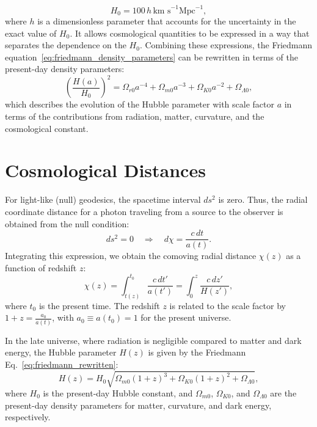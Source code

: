 \begin{equation}
    H_0 = 100 \, h \, \text{km s}^{-1} \text{Mpc}^{-1},
    \label{eq:hubble_parameter_current}
\end{equation}
where \( h \) is a dimensionless parameter that accounts for the uncertainty in the exact value of \( H_0 \). It allows cosmological quantities to be expressed in a way that separates the dependence on the $H_0$.
Combining these expressions, the Friedmann equation~\eqref{eq:friedmann_density_parameters} can be rewritten in terms of the present-day density parameters:
\begin{equation}
    \left( \frac{H(a)}{H_0} \right)^2 = \Omega_{r0} a^{-4} + \Omega_{m0} a^{-3} + \Omega_{K0} a^{-2} + \Omega_{\Lambda0},
    \label{eq:friedmann_rewritten}
\end{equation}
which describes the evolution of the Hubble parameter with scale factor \( a \) in terms of the contributions from radiation, matter, curvature, and the cosmological constant.

\section{Cosmological Distances}
For light-like (null) geodesics, the spacetime interval \( ds^2 \) is zero. Thus, the radial coordinate distance for a photon traveling from a source to the observer is obtained from the null condition:
\begin{equation}
    ds^2 = 0 \quad \Rightarrow \quad d\chi = \frac{c \, dt}{a(t)}.
    \label{eq:null_geodesic_condition}
\end{equation}
Integrating this expression, we obtain the comoving radial distance \( \chi(z) \) as a function of redshift \( z \):
\begin{equation}
    \chi(z) = \int_{t(z)}^{t_0} \frac{c \, dt'}{a(t')} = \int_{0}^{z} \frac{c \, dz'}{H(z')},
    \label{eq:comoving_radial_distance}
\end{equation}
where \( t_0 \) is the present time. The redshift \( z \) is related to the scale factor by \( 1 + z = \tfrac{a_0}{a(t)} \), with \( a_0 \equiv a(t_0) = 1 \) for the present universe.

In the late universe, where radiation is negligible compared to matter and dark energy, the Hubble parameter \( H(z) \) is given by the Friedmann Eq.~\eqref{eq:friedmann_rewritten}:
\begin{equation}
    H(z) = H_0 \sqrt{\Omega_{m0}(1+z)^3 + \Omega_{K0}(1+z)^2 + \Omega_{\Lambda0}},
    \label{eq:hubble_parameter_late_universe}
\end{equation}
where \( H_0 \) is the present-day Hubble constant, and \( \Omega_{m0} \), \( \Omega_{K0} \), and \( \Omega_{\Lambda0} \) are the present-day density parameters for matter, curvature, and dark energy, respectively.

